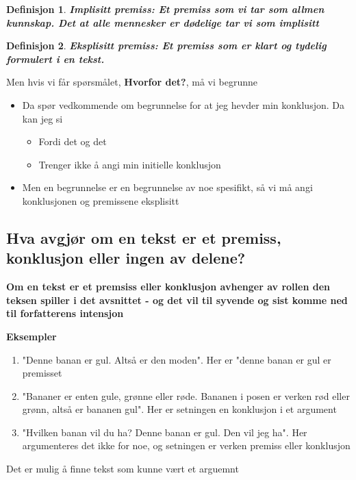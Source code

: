 \documentclass[11pt]{article}
\newtheorem{definition}{Definisjon}
\begin{document}
\begin{definition}
    \textbf{Implisitt premiss: Et premiss som vi tar som allmen kunnskap. Det at alle mennesker er dødelige tar vi som implisitt}
\end{definition}

\begin{definition}
    \textbf{Eksplisitt premiss: Et premiss som er klart og tydelig formulert i en tekst.}
\end{definition}

Men hvis vi får spørsmålet, \textbf{Hvorfor det?}, må vi begrunne

\begin{itemize}
    \item Da spør vedkommende om begrunnelse for at jeg hevder min konklusjon. Da kan jeg si
    \begin{itemize}
        \item Fordi det og det
        \item Trenger ikke å angi min initielle konklusjon
    \end{itemize}
    \item Men en begrunnelse er en begrunnelse av noe spesifikt, så vi må angi konklusjonen og premissene eksplisitt    
\end{itemize}


\subsection{Hva avgjør om en tekst er et premiss, konklusjon eller ingen av delene?}

\textbf{Om en tekst er et premsiss eller konklusjon avhenger av rollen den teksen spiller i det avsnittet - og det vil til syvende og sist komme ned til forfatterens intensjon}

\textbf{Eksempler}
\begin{enumerate}
    \item "Denne banan er gul. Altså er den moden". Her er "denne banan er gul er premisset
    \item "Bananer er enten gule, grønne eller røde. Bananen i posen er verken rød eller grønn, altså er bananen gul". Her er setningen en konklusjon i et argument
    \item "Hvilken banan vil du ha? Denne banan er gul. Den vil jeg ha". Her argumenteres det ikke for noe, og setningen er verken premiss eller konklusjon
\end{enumerate}

Det er mulig å finne tekst som kunne vært et arguemnt
\end{document}
